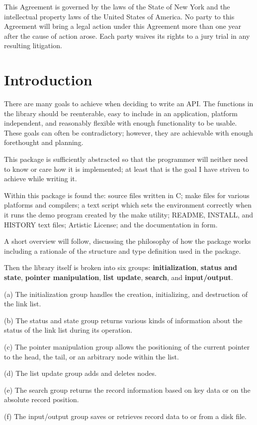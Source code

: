 \documentclass[10pt,letterpaper,titlepage]{article}
\newenvironment{lquote}{\begin{list}{}{}\item[]}{\end{list}}
\begin{document}
This Agreement is governed by the laws of the State of New York and the intellectual property laws of the United States of America. No party to this Agreement will bring a legal action under this Agreement more than one year after the cause of action arose. Each party waives its rights to a jury trial in any resulting litigation.
\newpage

\section{Introduction}
There are many goals to achieve when deciding to write an API.  The functions in the library should be reenterable, easy to include in an application, platform independent, and reasonably flexible with enough functionality to be usable.  These goals can often be contradictory; however, they are achievable with enough forethought and planning.
\vspace{8pt}

\noindent
This package is sufficiently abstracted so that the programmer will neither need to know or care how it is implemented; at least that is the goal I have striven to achieve while writing it.
\vspace{8pt}

\noindent
Within this package is found the: source files written in C; make files for various platforms and compilers; a text script which sets the environment correctly when it runs the demo program created by the make utility; README, INSTALL, and HISTORY text files; Artistic License; and the documentation in \LaTeXe\/ form.
\vspace{8pt}

\noindent
A short overview will follow, discussing the philosophy of how the package works including a rationale of the structure and type definition used in the package.
\vspace{8pt}

\noindent
Then the library itself is broken into six groups: \textbf{initialization}, \textbf{status and state}, \textbf{pointer manipulation}, \textbf{list update}, \textbf{search}, and \textbf{input/output}.

\begin{lquote}
(a) The initialization group handles the creation, initializing, and destruction of the link list.

(b) The status and state group returns various kinds of information about the status of the link list during its operation.

(c) The pointer manipulation group allows the positioning of the current pointer to the head, the tail, or an arbitrary node within the list.

(d) The list update group adds and deletes nodes.

(e) The search group returns the record information based on key data or on the absolute record position.

(f) The input/output group saves or retrieves record data to or from a disk file.
\end{lquote}
\end{document}
